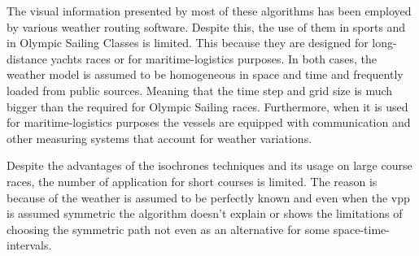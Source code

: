 The visual information presented by most of these algorithms has been employed by various weather routing software. Despite this, the use of them in sports and in Olympic Sailing Classes is limited. This because they are designed for long-distance yachts races or for maritime-logistics purposes. In both cases, the weather model is assumed to be homogeneous in space and time and frequently loaded from public sources. Meaning that the time step and grid size is much bigger than the required for Olympic Sailing races. Furthermore, when it is used for maritime-logistics purposes the vessels are equipped with communication and other measuring systems that account for weather variations. \par
Despite the advantages of the isochrones techniques and its usage on large course races, the number of application for short courses is limited. The reason is because of the weather is assumed to be perfectly known and even when the \acrshort{vpp} is assumed symmetric the algorithm doesn't explain or shows the limitations of choosing the symmetric path not even as an alternative for some space-time-intervals.\par    

